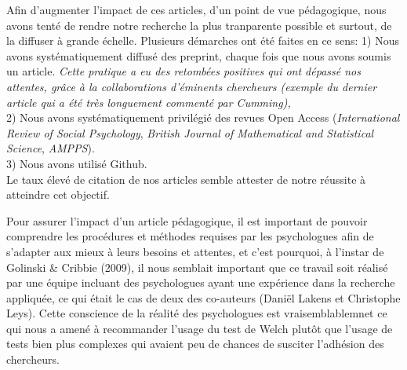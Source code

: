 \documentclass[
  12pt,
  french,
]{article}
\begin{document}
Afin d'augmenter l'impact de ces articles, d'un point de vue
pédagogique, nous avons tenté de rendre notre recherche la plus
tranparente possible et surtout, de la diffuser à grande échelle.
Plusieurs démarches ont été faites en ce sens: 1) Nous avons
systématiquement diffusé des preprint, chaque fois que nous avons soumis
un article. \emph{Cette pratique a eu des retombées positives qui ont
dépassé nos attentes, grâce à la collaborations d'éminents chercheurs
(exemple du dernier article qui a été très longuement commenté par
Cumming), }\\
2) Nous avons systématiquement privilégié des revues Open Access
(\emph{International Review of Social Psychology}, \emph{British Journal
of Mathematical and Statistical Science}, \emph{AMPPS}).\\
3) Nous avons utilisé Github.\\
Le taux élevé de citation de nos articles semble attester de notre
réussite à atteindre cet objectif.

\color{brun} Pour assurer l'impact d'un article pédagogique, il est
important de pouvoir comprendre les procédures et méthodes requises par
les psychologues afin de s'adapter aux mieux à leurs besoins et
attentes, et c'est pourquoi, à l'instar de Golinski \& Cribbie (2009),
il nous semblait important que ce travail soit réalisé par une équipe
incluant des psychologues ayant une expérience dans la recherche
appliquée, ce qui était le cas de deux des co-auteurs (Daniël Lakens et
Christophe Leys). Cette conscience de la réalité des psychologues est
vraisemblablemnet ce qui nous a amené à recommander l'usage du test de
Welch plutôt que l'usage de tests bien plus complexes qui avaient peu de
chances de susciter l'adhésion des chercheurs.
\end{document}
